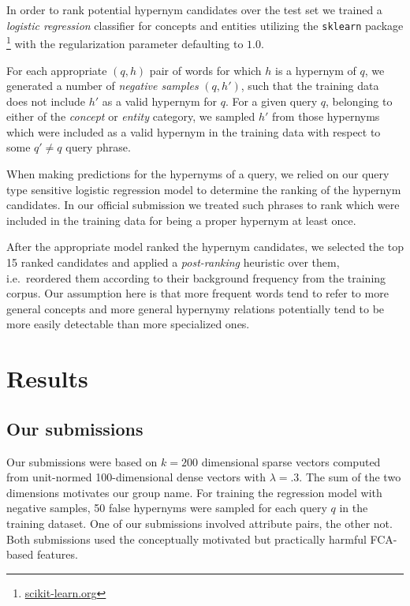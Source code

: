 \documentclass[11pt,a4paper]{article}
\begin{document}
In order to rank potential hypernym candidates over the test set we trained a 
\emph{logistic regression} classifier for concepts and entities utilizing the
\texttt{sklearn} package 
\citep{Pedregosa:2011}\footnote{\url{scikit-learn.org}} with the regularization 
parameter defaulting to $1.0$.

For each appropriate $(q,h)$ pair of words for which
$h$ is a hypernym of $q$, we generated a number of \emph{negative samples} $(q, h')$,
such that the training data does not include $h'$ as a valid hypernym for $q$.
For a given query $q$, belonging to either of the \textit{concept} or
\textit{entity} category, we sampled $h'$ from those hypernyms which were
included as a valid hypernym in the training data with respect to some $q' \neq
q$ query phrase.

When making predictions for the hypernyms of a query, we relied on our query
type sensitive logistic regression model to determine the ranking of the
hypernym candidates. In our official submission we treated such
phrases to rank which were included in the training data for 
being a proper hypernym at least once.

After the appropriate model ranked the hypernym candidates, we selected
the top 15 ranked candidates and applied a \emph{post-ranking} heuristic over them,
i.e.~reordered them according to their background frequency from the training
corpus. Our assumption here is that more frequent words tend to refer to more
general concepts and more general hypernymy relations potentially tend to be
more easily detectable than more specialized ones.

\section{Results} \label{sec:results}

\subsection{Our submissions}

Our submissions were based on $k=200$ dimensional sparse vectors computed from
unit-normed 100-dimensional dense vectors with $\lambda=.3$. The sum of the two
dimensions motivates our group name. For training the regression model with
negative samples, 50 false hypernyms were sampled for each query $q$ in the 
training dataset. One
of our submissions involved attribute pairs, the other not. Both
submissions used the conceptually motivated but practically harmful FCA-based
features.
\end{document}

